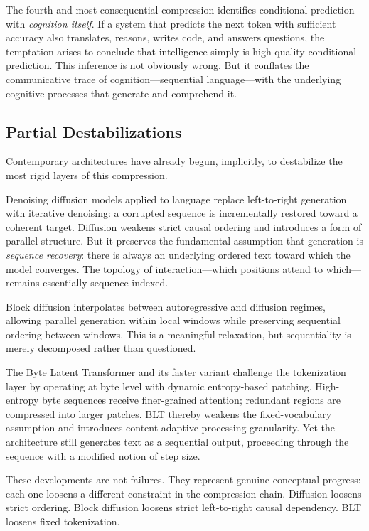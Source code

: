 \documentclass[11pt, a4paper]{article}
\theoremstyle{srn}
\theoremstyle{srnremark}
\begin{document}
The fourth and most consequential compression identifies conditional
prediction with \emph{cognition itself}.
If a system that predicts the next token with sufficient accuracy also
translates, reasons, writes code, and answers questions, the temptation
arises to conclude that intelligence simply is high-quality conditional
prediction.
This inference is not obviously wrong.
But it conflates the communicative trace of cognition---sequential
language---with the underlying cognitive processes that generate and
comprehend it.

\subsection{Partial Destabilizations}

Contemporary architectures have already begun, implicitly, to
destabilize the most rigid layers of this compression.

Denoising diffusion models applied to language \citep{ho2020ddpm,
austin2021discrete, lou2024diffusion} replace left-to-right generation
with iterative denoising: a corrupted sequence is incrementally
restored toward a coherent target.
Diffusion weakens strict causal ordering and introduces a form of
parallel structure.
But it preserves the fundamental assumption that generation is
\emph{sequence recovery}: there is always an underlying ordered text
toward which the model converges.
The topology of interaction---which positions attend to which---remains
essentially sequence-indexed.

Block diffusion \citep{arriola2025block} interpolates between
autoregressive and diffusion regimes, allowing parallel generation
within local windows while preserving sequential ordering between
windows.
This is a meaningful relaxation, but sequentiality is merely
decomposed rather than questioned.

The Byte Latent Transformer \citep{pagnoni2025blt} and its faster
variant \citep{kallini2026fastblt} challenge the tokenization layer
by operating at byte level with dynamic entropy-based patching.
High-entropy byte sequences receive finer-grained attention; redundant
regions are compressed into larger patches.
BLT thereby weakens the fixed-vocabulary assumption and introduces
content-adaptive processing granularity.
Yet the architecture still generates text as a sequential output,
proceeding through the sequence with a modified notion of step size.

These developments are not failures.
They represent genuine conceptual progress: each one loosens a
different constraint in the compression chain.
Diffusion loosens strict ordering.
Block diffusion loosens strict left-to-right causal dependency.
BLT loosens fixed tokenization.
\end{document}
